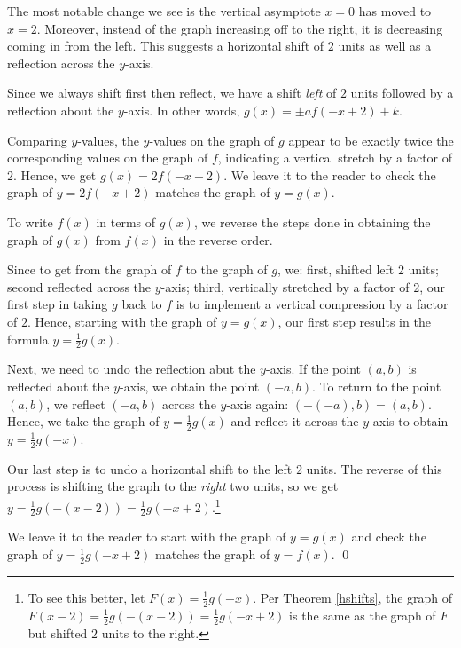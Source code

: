 \documentclass{ximera}
\begin{document}
\begin{example}
\begin{enumerate}
 \smallskip
 
 The most notable change we see is the vertical asymptote $x=0$ has moved to $x=2$.  Moreover, instead of the graph increasing off to the right, it is decreasing coming in from the left.  This suggests a horizontal shift of $2$ units as well as a reflection across the $y$-axis.  
 
 \smallskip
 
 Since we always shift first then reflect, we have a shift \textit{left} of $2$ units followed by a reflection about the $y$-axis.  In other words, $g(x) = \pm a f(-x+2) + k$.  
 
 \smallskip
 
 Comparing $y$-values, the $y$-values on the graph of $g$ appear to be exactly twice the corresponding values on the graph of $f$, indicating a vertical stretch by a factor of $2$.  Hence, we get $g(x) = 2 f(-x+2)$.  We leave it to the reader to check the graph of $y=2f(-x+2)$ matches the graph of $y=g(x)$.  
 
 \smallskip
 
To write $f(x)$ in terms of $g(x)$, we reverse the steps done in obtaining the graph of $g(x)$ from $f(x)$ in the reverse order.  

\smallskip

Since to get from the graph of $f$ to the graph of $g$, we: first, shifted left $2$ units; second reflected across the $y$-axis; third, vertically stretched by a factor of $2$, our first step in taking $g$ back to $f$ is to implement a vertical compression by a factor of $2$.  Hence, starting with the graph of $y=g(x)$, our first step results in the formula $y = \frac{1}{2} g(x)$. 

\smallskip

 Next, we need to undo the reflection abut the $y$-axis.  If the point $(a,b)$ is reflected about the $y$-axis, we obtain the point $(-a,b)$.  To return to the point $(a,b)$, we reflect $(-a,b)$ across the $y$-axis again: $(-(-a),b) = (a,b)$.  Hence, we take the graph of $y = \frac{1}{2} g(x)$ and reflect it across the $y$-axis to obtain $y = \frac{1}{2} g(-x)$.  
 
 \smallskip
 
 Our last step is to undo a horizontal shift to the left $2$ units.  The reverse of this process is shifting the graph to the \textit{right} two units, so we get $y = \frac{1}{2} g(-(x-2)) = \frac{1}{2} g(-x+2)$.\footnote{To see this better, let $F(x) = \frac{1}{2} g(-x)$.  Per Theorem \ref{hshifts}, the graph of  $F(x-2) = \frac{1}{2} g(-(x-2)) = \frac{1}{2} g(-x+2)$ is the same as the graph of $F$ but shifted $2$ units to the right.}  
 
 \smallskip
 
 We leave it to the reader to start with the graph of $y=g(x)$ and check the graph of $y =  \frac{1}{2} g(-x+2)$ matches the graph of $y = f(x)$. \qed

\end{enumerate}

\end{example}
\end{document}
